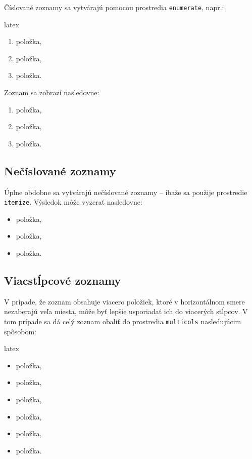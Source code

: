 Číslované zoznamy sa vytvárajú pomocou prostredia \texttt{enumerate}, napr.:
\begin{inlinecode}[breaklines=True]{latex}
\begin{enumerate}
\item položka,
\item položka,
\item položka.
\end{enumerate}
\end{inlinecode}

Zoznam sa zobrazí nasledovne:
\begin{enumerate}
\item položka,
\item položka,
\item položka.
\end{enumerate}

\subsection{Nečíslované zoznamy}

Úplne obdobne sa vytvárajú nečíslované zoznamy -- ibaže sa použije prostredie \texttt{itemize}. Výsledok môže vyzerať nasledovne:
\begin{itemize}
\item položka,
\item položka,
\item položka.
\end{itemize}

\subsection{Viacstĺpcové zoznamy}

V prípade, že zoznam obsahuje viacero položiek, ktoré v horizontálnom smere nezaberajú veľa miesta, môže byť lepšie usporiadať ich do viacerých stĺpcov. V tom prípade sa dá celý zoznam obaliť do prostredia \texttt{multicols} nasledujúcim spôsobom:
\begin{inlinecode}[breaklines=True]{latex}
\begin{multicols}{2}
\begin{itemize}
\item položka,
\item položka,
\item položka,
\item položka,
\item položka,
\item položka.
\end{itemize}
\end{multicols}
\end{inlinecode}

